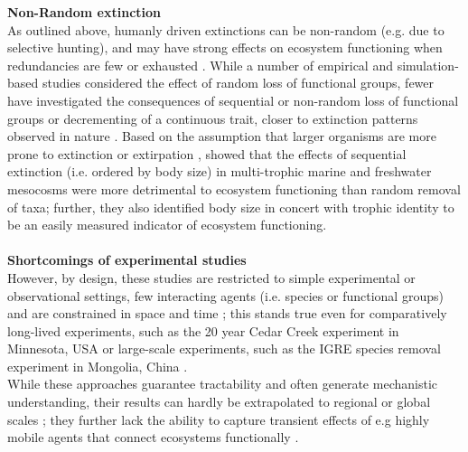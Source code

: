 %
\textbf{Non-Random extinction}\\
As outlined above, humanly driven extinctions can be non-random (e.g. due to selective hunting), and may have strong effects on ecosystem functioning when redundancies are few or exhausted \citep{ Wardle2011,Cardinale2012}. 
While a number of empirical \citep[e.g.][]{Tilman2001,OConnor2008} and simulation-based \citep[e.g.][]{Borrvall2000,Ives2005} studies considered the effect of random loss of functional groups,  fewer have investigated the consequences of sequential or non-random loss of functional groups or decrementing of a continuous trait,  closer to extinction patterns observed in nature \citep{Solan2004, Raffaelli2004}. 
 Based on the assumption that larger organisms are more prone to extinction or extirpation \citep[e.g. after][]{Solan2004,Borer2006,Olden2007}, \cite{Saguin2014} showed that the effects of sequential extinction (i.e. ordered by body size) in multi-trophic marine and freshwater mesocosms were more detrimental to ecosystem functioning than random removal of taxa; further, they also identified body size in concert with trophic identity to be an easily measured indicator of ecosystem functioning. 
%
 \\\\
%
\textbf{Shortcomings of experimental studies}\\
However, by design, these studies are restricted to simple experimental or observational settings, few interacting agents (i.e. species or functional groups) and are constrained in space and time \citep{Dobson2006,Estes2011,Cardinale2012}; this stands true even for comparatively long-lived experiments, such as the 20 year Cedar Creek experiment in Minnesota, USA \citep[][]{Tilman2001} or large-scale experiments, such as the IGRE species removal experiment in Mongolia, China \citep{Wu2015}.\\
While these approaches guarantee tractability and often generate mechanistic understanding, their results can hardly be extrapolated to regional or global scales \citep{Bulling2006,Naeem2012};
 they further lack the ability to capture transient effects of e.g highly mobile agents that connect ecosystems functionally \citep{France2006}. \\

